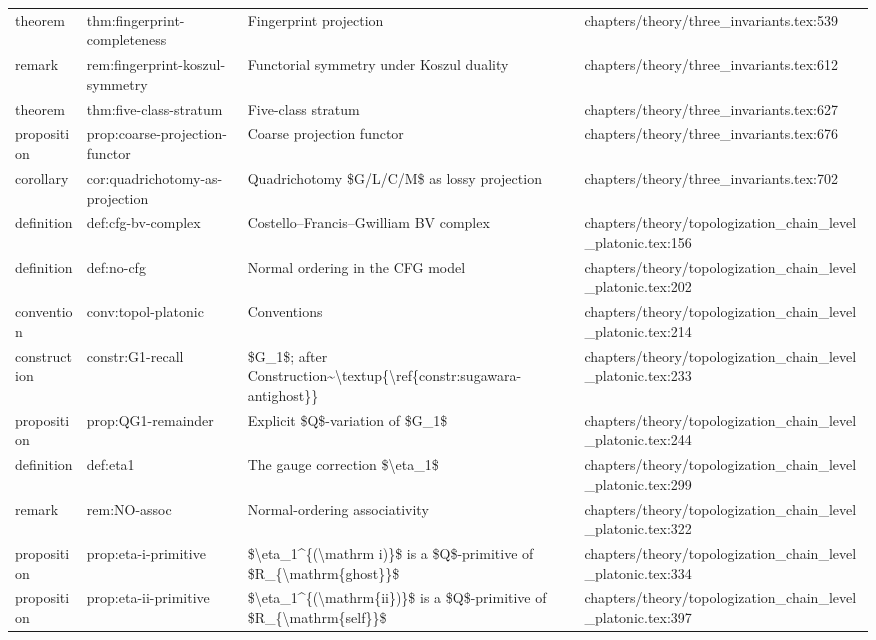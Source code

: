 \documentclass[11pt]{article}
\begin{document}
\begin{longtable}{L{0.10\textwidth}L{0.26\textwidth}L{0.42\textwidth}L{0.22\textwidth}}
theorem & thm:fingerprint-completeness & Fingerprint projection & chapters/theory/three\_invariants.tex:539\\
remark & rem:fingerprint-koszul-symmetry & Functorial symmetry under Koszul duality & chapters/theory/three\_invariants.tex:612\\
theorem & thm:five-class-stratum & Five-class stratum & chapters/theory/three\_invariants.tex:627\\
proposition & prop:coarse-projection-functor & Coarse projection functor & chapters/theory/three\_invariants.tex:676\\
corollary & cor:quadrichotomy-as-projection & Quadrichotomy \$G/L/C/M\$ as lossy projection & chapters/theory/three\_invariants.tex:702\\
definition & def:cfg-bv-complex & Costello--Francis--Gwilliam BV complex & chapters/theory/topologization\_chain\_level\_platonic.tex:156\\
definition & def:no-cfg & Normal ordering in the CFG model & chapters/theory/topologization\_chain\_level\_platonic.tex:202\\
convention & conv:topol-platonic & Conventions & chapters/theory/topologization\_chain\_level\_platonic.tex:214\\
construction & constr:G1-recall & \$G\_1\$; after Construction\textasciitilde{}\textbackslash{}textup\{\textbackslash{}ref\{constr:sugawara-antighost\}\} & chapters/theory/topologization\_chain\_level\_platonic.tex:233\\
proposition & prop:QG1-remainder & Explicit \$Q\$-variation of \$G\_1\$ & chapters/theory/topologization\_chain\_level\_platonic.tex:244\\
definition & def:eta1 & The gauge correction \$\textbackslash{}eta\_1\$ & chapters/theory/topologization\_chain\_level\_platonic.tex:299\\
remark & rem:NO-assoc & Normal-ordering associativity & chapters/theory/topologization\_chain\_level\_platonic.tex:322\\
proposition & prop:eta-i-primitive & \$\textbackslash{}eta\_1\textasciicircum{}\{(\textbackslash{}mathrm i)\}\$ is a \$Q\$-primitive of \$R\_\{\textbackslash{}mathrm\{ghost\}\}\$ & chapters/theory/topologization\_chain\_level\_platonic.tex:334\\
proposition & prop:eta-ii-primitive & \$\textbackslash{}eta\_1\textasciicircum{}\{(\textbackslash{}mathrm\{ii\})\}\$ is a \$Q\$-primitive of \$R\_\{\textbackslash{}mathrm\{self\}\}\$ & chapters/theory/topologization\_chain\_level\_platonic.tex:397\\

\end{longtable}
\end{document}
